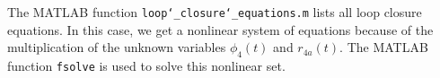 \documentclass[a4paper]{article}
\begin{document}
%	

The MATLAB function \texttt{loop\char`_closure\char`_equations.m} lists all loop closure equations. In this case, we get a nonlinear system of equations because of the multiplication of the unknown variables \(\phi_4(t)\) and \(r_{4a}(t)\). The MATLAB function \texttt{fsolve} is used to solve this nonlinear set.
\end{document}
